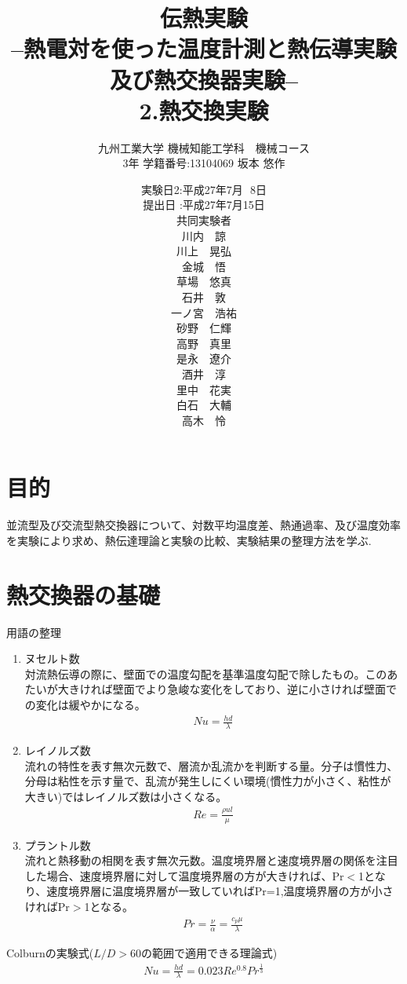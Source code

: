 \documentclass[a4j,twoside,openright,11pt]{jarticle}
\title{伝熱実験\\--熱電対を使った温度計測と熱伝導実験及び熱交換器実験--\\2.熱交換実験}
\author{九州工業大学 機械知能工学科　機械コース\\3年 学籍番号:13104069 坂本 悠作}
\date{
実験日2:平成27年7月\,\,\,\,8日\\
提出日 :平成27年7月15日\\
共同実験者\\
川内　諒\\
川上　晃弘\\
金城　悟\\
草場　悠真\\
石井　敦\\
一ノ宮　浩祐\\
砂野　仁輝\\
高野　真里\\
是永　遼介\\
酒井　淳\\
里中　花実\\
白石　大輔\\
高木　怜\\
}
\begin{document}
\maketitle
\newpage

\section{目的}
並流型及び交流型熱交換器について、対数平均温度差、熱通過率、及び温度効率を実験により求め、熱伝達理論と実験の比較、実験結果の整理方法を学ぶ.
\section{熱交換器の基礎}
用語の整理
\begin{enumerate}
\item ヌセルト数\\
対流熱伝導の際に、壁面での温度勾配を基準温度勾配で除したもの。このあたいが大きければ壁面でより急峻な変化をしており、逆に小さければ壁面での変化は緩やかになる。
\begin{eqnarray}
Nu = \frac{hd}{\lambda}
\end{eqnarray}
\item レイノルズ数\\
流れの特性を表す無次元数で、層流か乱流かを判断する量。分子は慣性力、分母は粘性を示す量で、乱流が発生しにくい環境(慣性力が小さく、粘性が大きい)ではレイノルズ数は小さくなる。
\begin{eqnarray}
Re = \frac{\rho u l}{\mu}
\end{eqnarray}
\item プラントル数\\
流れと熱移動の相関を表す無次元数。温度境界層と速度境界層の関係を注目した場合、速度境界層に対して温度境界層の方が大きければ、Pr$<$1となり、速度境界層に温度境界層が一致していればPr=1,温度境界層の方が小さければPr$>$1となる。
\begin{eqnarray}
Pr = \frac{\nu}{\alpha} =\frac{c_p\mu}{\lambda}
\end{eqnarray}
\end{enumerate}

Colburnの実験式($L/D>60$の範囲で適用できる理論式)
\begin{eqnarray}
Nu = \frac{hd}{\lambda} =0.023Re^{0.8}Pr^{\frac{1}{3}}
\end{eqnarray}
\end{document}
